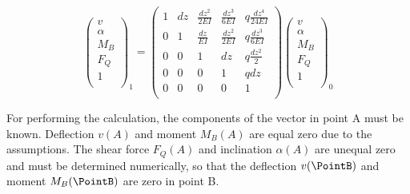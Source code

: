 \documentclass[11pt]{PyRollDocs}
\begin{document}
    \begin{equation}
        \begin{pmatrix}
            v  \\[2pt]
            \alpha     \\[2pt]
            M_B \\[2pt]
            F_Q    \\[2pt]
            1              \\[2pt]
        \end{pmatrix}_{1}
        =
        \begin{pmatrix}
            1 & dz & \frac{dz^2}{2 E I} & \frac{dz^3}{6 E I} & q \frac{dz^4}{24 E I} \\[2pt]
            0 & 1  & \frac{dz}{E I}     & \frac{dz^2}{2 E I} & q \frac{dz^3}{6 E I}  \\[2pt]
            0 & 0  & 1                  & dz                 & q \frac{dz^2}{2}                                      \\[2pt]
            0 & 0  & 0                  & 1                  & q dz                                                  \\[2pt]
            0 & 0  & 0                  & 0                  & 1                                                                           \\[2pt]
        \end{pmatrix}
        \begin{pmatrix}
            v  \\[2pt]
            \alpha     \\[2pt]
            M_B \\[2pt]
            F_Q   \\[2pt]
            1              \\[2pt]
        \end{pmatrix}_{0}
        \label{eq:matrix-method}
    \end{equation}

    For performing the calculation, the components of the vector in point A must be known.
    Deflection $v(A)$ and moment $M_B(A)$ are equal zero due to the assumptions.
    The shear force $F_Q(A)$ and inclination $\alpha(A)$ are unequal zero and must be determined numerically,
    so that the deflection $v(\PointB)$ and moment $M_B(\PointB)$ are zero in point B.
\end{document}
